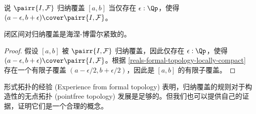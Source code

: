 说 $\pairr{I, \mathcal{F}}$ 归纳覆盖 $[a, b]$ 当仅存在 $\epsilon : \Qp$，使得 $(a - \epsilon, b + \epsilon) \cover \pairr{I, \mathcal{F}}$。

\begin{cor} \label{interval-Heine-Borel}
%
%
闭区间对归纳覆盖是海涅-博雷尔紧致的。
\end{cor}

\begin{proof}
  假设 $[a, b]$ 被 $\pairr{I, \mathcal{F}}$ 归纳覆盖，因此仅存在 $\epsilon : \Qp$，使得 $(a - \epsilon, b + \epsilon) \cover \pairr{I, \mathcal{F}}$。根据 \cref{reals-formal-topology-locally-compact} 存在一个有限子覆盖 $(a - \epsilon/2, b + \epsilon/2)$，因此是 $[a, b]$ 的有限子覆盖。
\end{proof}

形式拓扑的经验 (Experience from formal topology) 表明，归纳覆盖的规则对于构造性的无点拓扑 (pointfree topology) 发展是足够的。但我们也可以提供自己的证据，证明它们是一个合理的概念。


